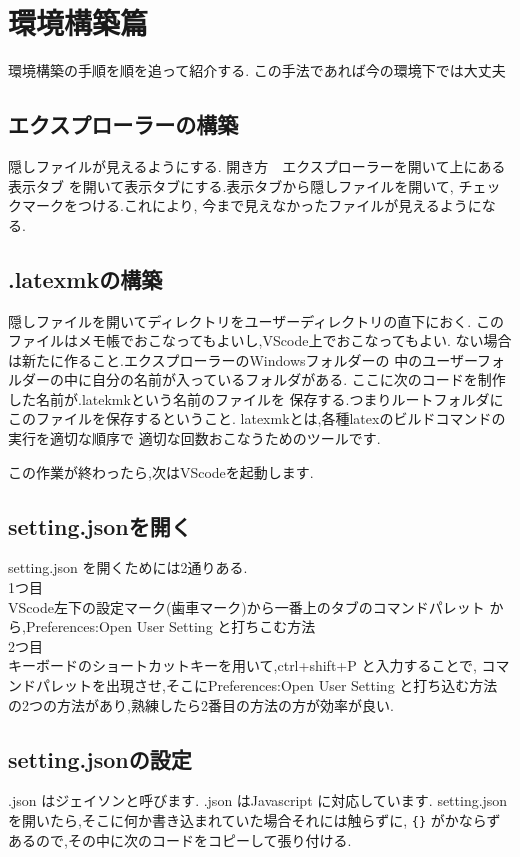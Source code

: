 \documentclass{ltjsarticle}
\begin{document}
\section{環境構築篇}
環境構築の手順を順を追って紹介する.
この手法であれば今の環境下では大丈夫
\subsection{エクスプローラーの構築}
隠しファイルが見えるようにする.
開き方　エクスプローラーを開いて上にある表示タブ
を開いて表示タブにする.表示タブから隠しファイルを開いて,
チェックマークをつける.これにより,
今まで見えなかったファイルが見えるようになる.

\subsection{.latexmkの構築} %

\label{sub:.latexmkの構築}
隠しファイルを開いてディレクトリをユーザーディレクトリの直下におく.
このファイルはメモ帳でおこなってもよいし,VScode上でおこなってもよい.
ない場合は新たに作ること.エクスプローラーのWindowsフォルダーの
中のユーザーフォルダーの中に自分の名前が入っているフォルダがある.
ここに次のコードを制作した名前が.latekmkという名前のファイルを
保存する.つまりルートフォルダにこのファイルを保存するということ.
latexmkとは,各種latexのビルドコマンドの実行を適切な順序で
適切な回数おこなうためのツールです.


この作業が終わったら,次はVScodeを起動します.
\subsection{setting.jsonを開く}
setting.json を開くためには2通りある.\\
1つ目\\
VScode左下の設定マーク(歯車マーク)から一番上のタブのコマンドパレット
から,Preferences:Open User Setting と打ちこむ方法\\
2つ目\\
キーボードのショートカットキーを用いて,ctrl+shift+P と入力することで,
コマンドパレットを出現させ,そこにPreferences:Open User Setting
と打ち込む方法\\
の2つの方法があり,熟練したら2番目の方法の方が効率が良い.
\subsection{setting.jsonの設定}
.json はジェイソンと呼びます.
.json はJavascript に対応しています.
setting.json を開いたら,そこに何か書き込まれていた場合それには触らずに,
\verb|{}|
がかならずあるので,その中に次のコードをコピーして張り付ける.
\end{document}
